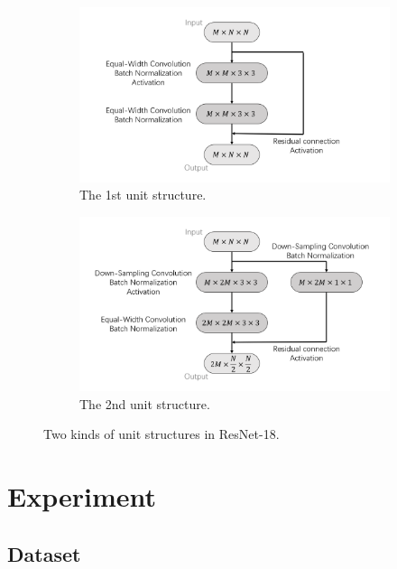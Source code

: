 \documentclass{article}
\begin{document}
\begin{figure}[p]
	\centering
	\begin{subfigure}{0.75\textwidth}
		\centering
		\includegraphics[width=\linewidth]
		{../Graph/ResNetI.png}
		\caption{The 1st unit structure.}
	\end{subfigure}
	\begin{subfigure}{0.75\textwidth}
		\centering
		\includegraphics[width=\linewidth]
		{../Graph/ResNetII.png}
		\caption{The 2nd unit structure.}
	\end{subfigure}
	\caption{Two kinds of unit structures in ResNet-18.}
	\label{fig:resnet}
\end{figure}

\section{Experiment}

\subsection{Dataset}
\end{document}
